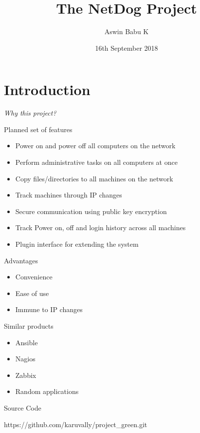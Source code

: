 \documentclass{beamer}
\title[Your Short Title]{The NetDog Project}
\author{Aswin Babu K}
\institute{College of Engineering Trivandrum}
\date{16th September 2018}
\begin{document}
\begin{frame}
    \titlepage
\end{frame}

\section{Introduction}

\begin{frame}
    \begin{center}
        \em Why this project?
    \end{center}
\end{frame}

\begin{frame}{Planned set of features}
    \begin{itemize}
        \item<2-> Power on and power off all computers on the network
        \item<3-> Perform administrative tasks on all computers at once
        \item<4-> Copy files/directories to all machines on the network
        \item<5-> Track machines through IP changes
        \item<6-> Secure communication using public key encryption
        \item<7-> Track Power on, off and login history across all machines
        \item<8-> Plugin interface for extending the system
    \end{itemize}
\end{frame}

\begin{frame}{Advantages}
    \begin{itemize}
        \item<2-> Convenience
        \item<3-> Ease of use
        \item<4-> Immune to IP changes 
    \end{itemize}
\end{frame}

\begin{frame}{Similar products}
    \begin{itemize}
        \item<2-> Ansible
        \item<3-> Nagios
        \item<4-> Zabbix
        \item<5-> Random applications
    \end{itemize}
\end{frame}

\begin{frame}{Source Code} 
    \begin{center}
        \large https://github.com/karuvally/project\_green.git
    \end{center}
\end{frame}
\end{document}
